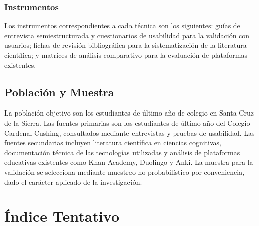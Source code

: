 \documentclass{univalle-perfil}
\begin{document}
\subsubsection{Instrumentos}

Los instrumentos correspondientes a cada técnica son los siguientes: guías de entrevista semiestructurada y cuestionarios de usabilidad para la validación con usuarios; fichas de revisión bibliográfica para la sistematización de la literatura científica; y matrices de análisis comparativo para la evaluación de plataformas existentes.

\subsection{Población y Muestra}

La población objetivo son los estudiantes de último año de colegio en Santa Cruz de la Sierra. Las fuentes primarias son los estudiantes de último año del Colegio Cardenal Cushing, consultados mediante entrevistas y pruebas de usabilidad. Las fuentes secundarias incluyen literatura científica en ciencias cognitivas, documentación técnica de las tecnologías utilizadas y análisis de plataformas educativas existentes como Khan Academy, Duolingo y Anki. La muestra para la validación se selecciona mediante muestreo no probabilístico por conveniencia, dado el carácter aplicado de la investigación.

\section{Índice Tentativo}
\end{document}
